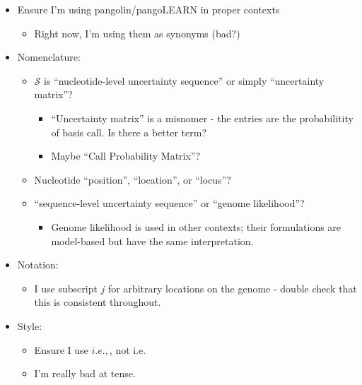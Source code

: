 \documentclass[
]{article}
\providecommand{\tightlist}{%
  \setlength{\itemsep}{0pt}\setlength{\parskip}{0pt}}
\newcommand{\ie}{\textit{i.e.},\xspace}
\newcommand{\nps}{\mathcal{S}} %
\begin{document}
\begin{itemize}
\tightlist
\item
  Ensure I'm using pangolin/pangoLEARN in proper contexts

  \begin{itemize}
  \tightlist
  \item
    Right now, I'm using them as synonyms (bad?)
  \end{itemize}
\item
  Nomenclature:

  \begin{itemize}
  \tightlist
  \item
    \(\nps\) is ``nucleotide-level uncertainty sequence'' or simply
    ``uncertainty matrix''?

    \begin{itemize}
    \tightlist
    \item
      ``Uncertainty matrix'' is a misnomer - the entries are the
      probabilitity of basis call. Is there a better term?
    \item
      Maybe ``Call Probability Matrix''?
    \end{itemize}
  \item
    Nucleotide ``position'', ``location'', or ``locus''?
  \item
    ``sequence-level uncertainty sequence'' or ``genome likelihood''?

    \begin{itemize}
    \tightlist
    \item
      Genome likelihood is used in other contexts; their formulations
      are model-based but have the same interpretation.
    \end{itemize}
  \end{itemize}
\item
  Notation:

  \begin{itemize}
  \tightlist
  \item
    I use subscript \(j\) for arbitrary locations on the genome - double
    check that this is consistent throughout.
  \end{itemize}
\item
  Style:

  \begin{itemize}
  \tightlist
  \item
    Ensure I use \(\ie\), not i.e.
  \item
    I'm really bad at tense.
  \end{itemize}
\end{itemize}
\end{document}
